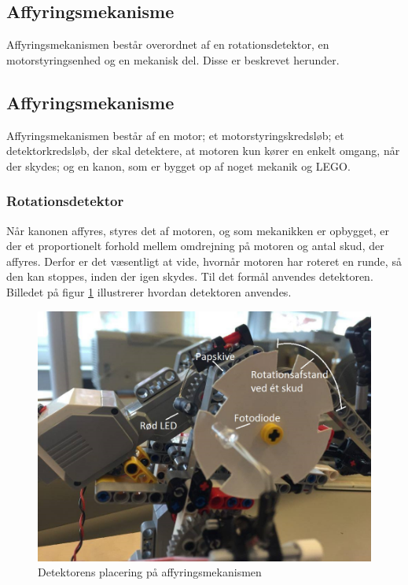 \subsection{Affyringsmekanisme} 
Affyringsmekanismen består overordnet af en rotationsdetektor, en motorstyringsenhed og en mekanisk del. Disse er beskrevet herunder. 

\subsection{Affyringsmekanisme}
Affyringsmekanismen består af en motor; et motorstyringskredsløb; et detektorkredsløb, der skal detektere, at motoren kun kører en enkelt omgang, når der skydes; og en kanon, som er bygget op af noget mekanik og LEGO. 

\subsubsection{Rotationsdetektor}
Når kanonen affyres, styres det af motoren, og som mekanikken er opbygget, er der et proportionelt forhold mellem omdrejning på motoren og antal skud, der affyres. Derfor er det væsentligt at vide, hvornår motoren har roteret en runde, så den kan stoppes, inden der igen skydes. Til det formål anvendes detektoren. Billedet på figur \ref{fig:detektor} illustrerer hvordan detektoren anvendes.

\begin{figure}[H]
	\centering
	\includegraphics[width=\textwidth]{Afsnit/DesignOgImplementering/images/detektor}
	\caption{Detektorens placering på affyringsmekanismen}
	\label{fig:detektor}
\end{figure}

